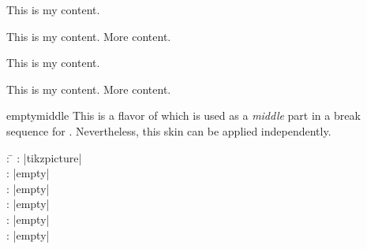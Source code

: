 \begin{dispExample}
\begin{tcbraster}[empty,skin=emptyfirst,raster equal height,raster columns=4,
    coltitle=Navy,borderline={2pt}{0pt}{black!10!white},
    left=1mm,right=1mm,top=1mm,bottom=1mm,middle=1mm]
  \begin{tcolorbox}
    This is my content.
  \end{tcolorbox}
  \begin{tcolorbox}
    This is my content.
    \tcblower
    More content.
  \end{tcolorbox}
  \begin{tcolorbox}[adjusted title=My title]
    This is my content.
  \end{tcolorbox}
  \begin{tcolorbox}[adjusted title=My title]
    This is my content.
    \tcblower
    More content.
  \end{tcolorbox}
\end{tcbraster}
\end{dispExample}


\clearpage

\begin{docSkin}{emptymiddle}
This is a flavor of  which is used as a \emph{middle} part
in a break sequence for .
Nevertheless, this skin can be applied independently.
\begin{tcolorbox}[skintable=emptymiddle]
  \begin{tabbing}
    : \=\kill
    :  \> |tikzpicture|\\ 
    :           \> |empty|\\
    : \> |empty|\\ 
    :        \> |empty|\\
    :    \> |empty|\\
    :           \> |empty|
  \end{tabbing}
\end{tcolorbox}
\end{docSkin}


